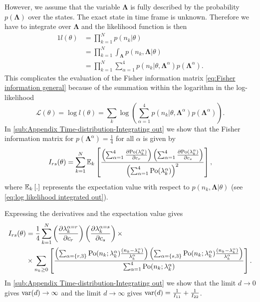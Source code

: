 However, we assume that the variable $\bm{\Lambda}$ is fully described by the probability $p(\bm{\Lambda})$ over the states. The exact state in time frame is unknown. Therefore we have to integrate over $\bm{\Lambda}$ and the likelihood function is then
%
\begin{alignat}{1}
	l(\theta)
	&=\prod_{k=1}^Np(n_k|\theta)\nonumber\\
	&=\prod_{k=1}^N\int_{\bm{\Lambda}}p(n_k,\bm{\Lambda}|\theta)\nonumber\\
	&=\prod_{k=1}^N\sum_{\alpha=1}^4p(n_k|\theta,\bm{\Lambda}^\alpha)p(\bm{\Lambda}^\alpha).
	\label{eq:FREM likelihood Lanbda integrated out}
\end{alignat}
%
This complicates the evaluation of the Fisher information matrix \autoref{eq:Fisher information general} because of the summation within the logarithm in the log-likelihood
%
\begin{equation}
	\mathcal{L}(\theta)=\log l(\theta)=\sum_k\log\left(\sum_{\alpha=1}^4p(n_k|\theta,\bm{\Lambda}^\alpha)p(\bm{\Lambda}^\alpha)\right).
	\label{eq:log likelihood integrated out}
\end{equation}
%
In \autoref{sub:Appendix Time-distribution-Integrating out} we show that the Fisher information matrix for $p(\bm{\Lambda}^\alpha)=\frac{1}{4}$ for all $\alpha$ is given by
%
\begin{equation}
	I_{rs}(\theta) =\sum_{k=1}^N\mathbb{E}_k\left[\frac{\left(\sum_{\alpha=1}^4\frac{\partial\mathrm{Po}(\lambda_k^\alpha)}{\partial c_r}\right)\left(\sum_{\alpha=1}^4\frac{\partial\mathrm{Po}(\lambda_k^\alpha)}{\partial c_s}\right)}{\left(\sum_{\alpha=1}^4\mathrm{Po}(\lambda_k^\alpha)\right)^2}\right],
	\label{eq:Fisher Information Blinking Integrating Out}
\end{equation}
%
where $\mathbb{E}_k\left[.\right]$ represents the expectation value with respect to $p(n_k,\bm{\Lambda}|\theta)$ (see \autoref{eq:log likelihood integrated out}). 

Expressing the derivatives and the expectation value gives
%
\begin{alignat}{2}
	I_{rs}(\theta)&=\frac{1}{4}\sum_{k=1}^N\left(\frac{\partial\lambda_k^{\alpha=r}}{\partial c_r}\right)\left(\frac{\partial\lambda_k^{\alpha=s}}{\partial c_s}\right)\times \nonumber\\
	&\times \sum_{n_k\geq0}\left[\frac{\left(\sum_{\alpha=\{r,3\}}\mathrm{Po}(n_k;\lambda_k^\alpha)\frac{(n_k-\lambda_k^\alpha)}{\lambda_k^\alpha}\right)\left(\sum_{\alpha=\{s,3\}}\mathrm{Po}(n_k;\lambda_k^\alpha)\frac{(n_k-\lambda_k^\alpha)}{\lambda_k^\alpha}\right)}{\sum_{\alpha=1}^4\mathrm{Po}(n_k;\lambda_k^\alpha)}\right].
	\label{eq:FI-blinking}
\end{alignat}
%
In \autoref{sub:Appendix Time-distribution-Integrating out} we show that the limit $d\rightarrow0$ gives $\mathrm{var}(d)\rightarrow\infty$ and the limit $d\rightarrow\infty$ gives $\mathrm{var}(d)=\frac{1}{I_{11}}+\frac{1}{I_{22}}$.  


